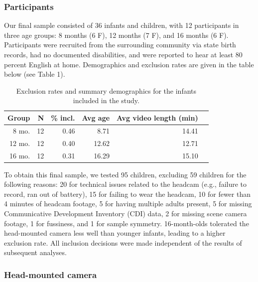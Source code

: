 \documentclass[english,man]{apa6}
\begin{document}
\subsubsection{Participants}\label{participants}

Our final sample consisted of 36 infants and children, with 12
participants in three age groups: 8 months (6 F), 12 months (7 F), and
16 months (6 F). Participants were recruited from the surrounding
community via state birth records, had no documented disabilities, and
were reported to hear at least 80 percent English at home. Demographics
and exclusion rates are given in the table below (see Table 1).

\begin{table}[ht]
\centering
\begin{tabular}{rrrrrr}
\hline
Group & N & \% incl. & Avg age & Avg video length (min) \\
\hline
8 mo. &   12 & 0.46 & 8.71 & 14.41 \\
12 mo. &  12 & 0.40 & 12.62 & 12.71 \\
16 mo. &  12 & 0.31 & 16.29 & 15.10\\
\hline
\end{tabular}
\caption{Exclusion rates and summary demographics for the infants included in the study.} 
\end{table}

To obtain this final sample, we tested 95 children, excluding 59
children for the following reasons: 20 for technical issues related to
the headcam (e.g., failure to record, ran out of battery), 15 for
failing to wear the headcam, 10 for fewer than 4 minutes of headcam
footage, 5 for having multiple adults present, 5 for missing
Communicative Development Inventory (CDI) data, 2 for missing scene
camera footage, 1 for fussiness, and 1 for sample symmetry.
16-month-olds tolerated the head-mounted camera less well than younger
infants, leading to a higher exclusion rate. All inclusion decisions
were made independent of the results of subsequent analyses.

\subsubsection{Head-mounted camera}\label{head-mounted-camera}
\end{document}
